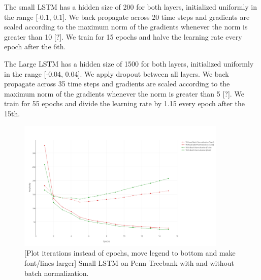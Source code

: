 \documentclass{article}
\begin{document}
The small LSTM has a hidden size of 200 for both layers, initialized uniformly in the range [-0.1, 0.1]. We back propagate across 20 time steps and gradients are scaled according to the maximum norm of the gradients whenever the norm is greater than 10 [?]. We train for 15 epochs and halve the learning rate every epoch after the 6th.  

The Large LSTM has a hidden size of 1500 for both layers, initialized uniformly in the range [-0.04, 0.04]. We apply dropout between all layers. We back propagate across 35 time steps and gradients are scaled according to the maximum norm of the gradients whenever the norm is greater than 5 [?]. We train for 55 epochs and divide the learning rate by 1.15 every epoch after the 15th.

\begin{figure}[t]
  \centering
  \includegraphics[width=100mm]{ptb_small_norm_plot.png}
  \caption{[Plot iterations instead of epochs, move legend to bottom and make font/lines larger] Small LSTM on Penn Treebank with and without batch normalization.}
  \label{overflow}
\end{figure}
\end{document}
